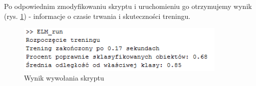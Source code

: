 \documentclass{article}
\begin{document}
Po odpowiednim zmodyfikowaniu skryptu i uruchomieniu go otrzymujemy wynik (rys. \ref{elm_run_result}) - informacje o czasie trwania i skuteczności treningu.
\begin{figure}[H]
\centering
\includegraphics[width=0.9\textwidth]{elm_results.PNG}
\caption{Wynik wywołania skryptu}
\label{elm_run_result}
\end{figure}
\end{document}
